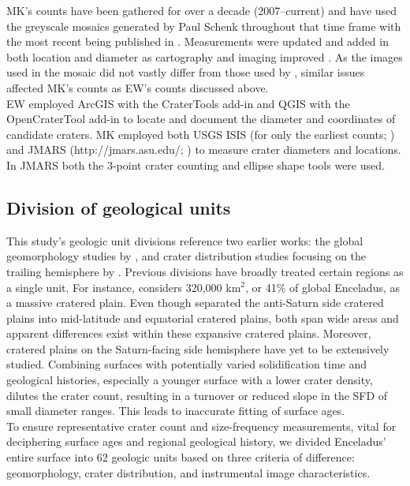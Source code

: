 \documentclass[preprint,12pt,3p,times,authoryear]{elsarticle}
\begin{document}
MK's counts have been gathered for over a decade (2007–current) and have used the greyscale mosaics generated by Paul Schenk throughout that time frame \citep{Schenk2011,Schenk2018} with the most recent being published in \citet{Schenk2024}. Measurements were updated and added in both location and diameter as cartography and imaging improved \citet{Kirchoff2016,Kirchoff2018}. As the images used in the mosaic did not vastly differ from those used by \citet{Bland2018}, similar issues affected MK's counts as EW's counts discussed above.\\

EW employed ArcGIS with the CraterTools add-in \citep{Kneissl2011} and QGIS with the OpenCraterTool add-in \citep{Heyer2023} to locate and document the diameter and coordinates of candidate craters. MK employed both USGS ISIS (for only the earliest counts; \citealt{Kirchoff2009}) and JMARS (http://jmars.asu.edu/; \citealt{Christensen2009}) to measure crater diameters and locations.  In JMARS both the 3-point crater counting and ellipse shape tools were used.

\subsection{Division of geological units}
\label{sub:gu}
This study’s geologic unit divisions reference two earlier works: the global geomorphology studies by \citet{CrowWillard2015}, and crater distribution studies focusing on the trailing hemisphere by \citet{Kirchoff2009}. Previous divisions have broadly treated certain regions as a single unit. For instance, \citet{CrowWillard2015} considers 320,000 km$^{2}$, or 41\% of global Enceladus, as a massive cratered plain. Even though \citet{Kirchoff2009} separated the anti-Saturn side cratered plains into mid-latitude and equatorial cratered plains, both span wide areas and apparent differences exist within these expansive cratered plains. Moreover, cratered plains on the Saturn-facing side hemisphere have yet to be extensively studied. Combining surfaces with potentially varied solidification time and geological histories, especially a younger surface with a lower crater density, dilutes the crater count, resulting in a turnover or reduced slope in the SFD of small diameter ranges. This leads to inaccurate fitting of surface ages. \\

To ensure representative crater count and size-frequency measurements, vital for deciphering surface ages and regional geological history, we divided Enceladus’ entire surface into 62 geologic units based on three criteria of difference: geomorphology, crater distribution, and instrumental image characteristics.
\end{document}
